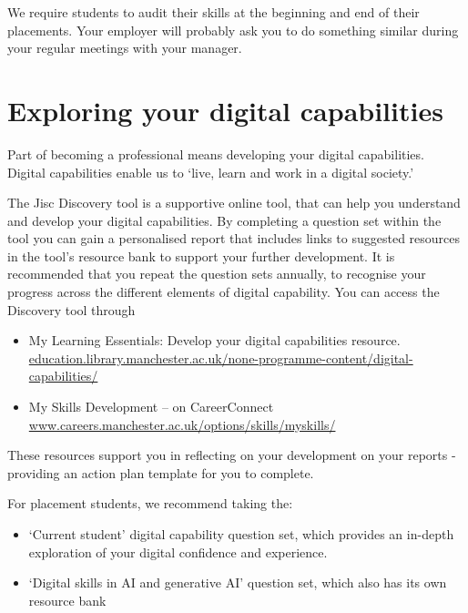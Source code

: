 \documentclass[
]{book}
\providecommand{\tightlist}{%
  \setlength{\itemsep}{0pt}\setlength{\parskip}{0pt}}
\begin{document}
We require students to audit their skills at the beginning and end of their placements. Your employer will probably ask you to do something similar during your regular meetings with your manager.

\section{Exploring your digital capabilities}\label{digital}

Part of becoming a professional means developing your digital capabilities. Digital capabilities enable us to `live, learn and work in a digital society.'

The Jisc Discovery tool is a supportive online tool, that can help you understand and develop your digital capabilities. By completing a question set within the tool you can gain a personalised report that includes
links to suggested resources in the tool's resource bank to support your further development. It is recommended that you repeat the question sets annually, to recognise your progress across the different elements of digital capability. You can access the Discovery tool through

\begin{itemize}
\tightlist
\item
  My Learning Essentials: Develop your digital capabilities resource. \href{https://www.education.library.manchester.ac.uk/none-programme-content/digital-capabilities/}{education.library.manchester.ac.uk/none-programme-content/digital-capabilities/}
\item
  My Skills Development -- on CareerConnect \href{https://www.careers.manchester.ac.uk/options/skills/myskills/}{www.careers.manchester.ac.uk/options/skills/myskills/} \citep{audit}
\end{itemize}

These resources support you in reflecting on your development on your reports - providing an action plan template for you to complete.

For placement students, we recommend taking the:

\begin{itemize}
\tightlist
\item
  `Current student' digital capability question set, which provides an in-depth exploration of your digital confidence and experience.
\item
  `Digital skills in AI and generative AI' question set, which also has its own resource bank
\end{itemize}
\end{document}
